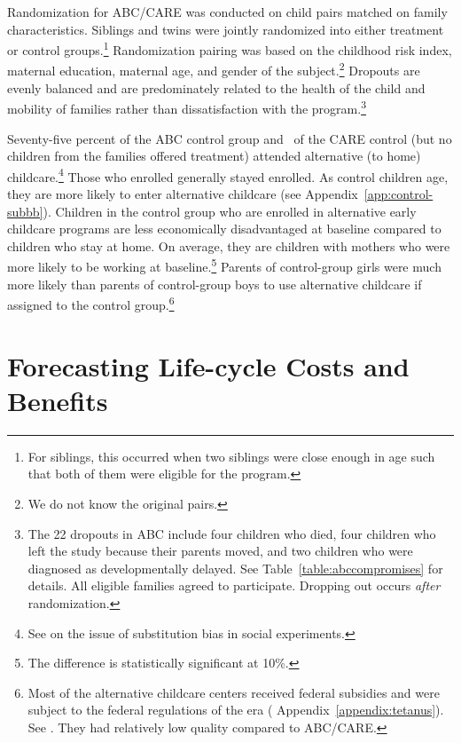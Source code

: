 Randomization for ABC/CARE was conducted on child pairs matched on family characteristics. Siblings and twins were jointly randomized into either treatment or control groups.\footnote{For siblings, this occurred when two siblings were close enough in age such that both of them were eligible for the program.} Randomization pairing was based on the childhood risk index, maternal education, maternal age, and gender of the subject.\footnote{We do not know the original pairs.} Dropouts are evenly balanced and are predominately related to the health of the child and mobility of families rather than dissatisfaction with the program.\footnote{The 22 dropouts in ABC include four children who died, four children who left the study because their parents moved, and two children who were diagnosed as developmentally delayed. See Table~\ref{table:abccompromises} for details. All eligible families agreed to participate. Dropping out occurs \emph{after} randomization.}

Seventy-five percent of the ABC control group and \treatsubscarec\ of the CARE control (but no children from the families offered treatment) attended alternative (to home) childcare.\footnote{See \cite{Heckman_Hohmann_etal_2000_QJE} on the issue of substitution bias in social experiments.} Those who enrolled generally stayed enrolled. As control children age, they are more likely to enter alternative childcare (see  Appendix~\ref{app:control-subbb}). Children in the control group who are enrolled in alternative early childcare programs are less economically disadvantaged at baseline compared to children who stay at home. On average, they are children with mothers who were more likely to be working at baseline.\footnote{The difference is statistically significant at 10\%.} Parents of control-group girls were much more likely than parents of control-group boys to use alternative childcare if assigned to the control group.\footnote{Most of the alternative childcare centers received federal subsidies and were subject to the federal regulations of the era ( Appendix~\ref{appendix:tetanus}). See \citet{Department-of-Health_1968_DayCareRequirements,NCGA_1971_House-Bill-100,Ramey-et-al_1977_Intro-to-ABC,Ramey_Campbell_1979_SR,Ramey_McGinness_etal_1982_Abecedarianapproach, Burchinal_Campbell_etal_1997_CD}. They had relatively low quality compared to ABC/CARE.}

\section{Forecasting Life-cycle Costs and Benefits}\label{section:cbamethodology}


